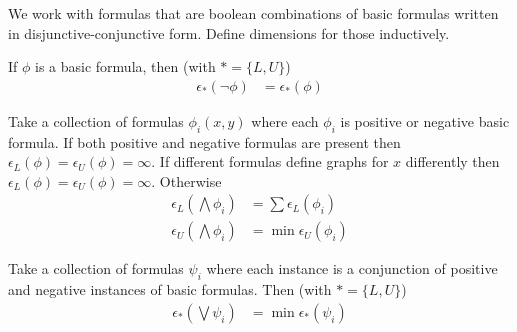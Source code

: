 \documentclass{amsart}
\begin{document}
We work with formulas that are boolean combinations of basic formulas written in disjunctive-conjunctive form.
Define dimensions for those inductively.

\begin{Definition}[Negation]
	If $\phi$ is a basic formula, then (with $* = \{L, U\}$)
	\begin{align*}
		\epsilon_*(\neg \phi) &= \epsilon_*(\phi)
	\end{align*}
\end{Definition}

\begin{Definition}[Conjunction]
	Take a collection of formulas $\phi_i(x, y)$ where each $\phi_i$ is positive or negative basic formula.
	If both positive and negative formulas are present then $\epsilon_L(\phi) = \epsilon_U(\phi) = \infty$.
	If different formulas define graphs for $x$ differently then $\epsilon_L(\phi) = \epsilon_U(\phi) = \infty$.
	Otherwise
	\begin{align*}
		\epsilon_L(\bigwedge \phi_i) &= \sum \epsilon_L(\phi_i) \\
		\epsilon_U(\bigwedge \phi_i) &= \min \epsilon_U(\phi_i)
	\end{align*}
\end{Definition}

\begin{Definition} [Disjunction]
	Take a collection of formulas $\psi_i$ where each instance is a conjunction of positive and negative instances of basic formulas.
	Then (with $* = \{L, U\}$)
	\begin{align*}
		\epsilon_*(\bigvee \psi_i) &= \min \epsilon_*(\psi_i)
	\end{align*}
\end{Definition}

\end{document}
